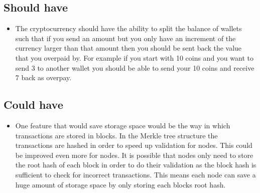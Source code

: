 \documentclass{l4proj}
\begin{document}
\subsection{Should have}
\begin{itemize}
    \item The cryptocurrency should have the ability to split the balance of wallets such that if you send an amount but you only
    have an increment of the currency larger than that amount then you should be sent back the value that you overpaid by.
    For example if you start with 10 coins and you want to send 3 to another wallet you should be able to send your 10 coins
    and receive 7 back as overpay.    
\end{itemize}

\subsection{Could have}
\begin{itemize}
    \item One feature that would save storage space would be the way in which transactions are stored in blocks. In the Merkle tree
    structure the transactions are hashed in order to speed up validation for nodes. This could be improved even more for 
    nodes. It is possible that nodes only need to store the root hash of each block in order to do their validation as the
    block hash is sufficient to check for incorrect transactions. This means each node can save a huge amount of storage space
    by only storing each blocks root hash.
\end{itemize}
\end{document}
